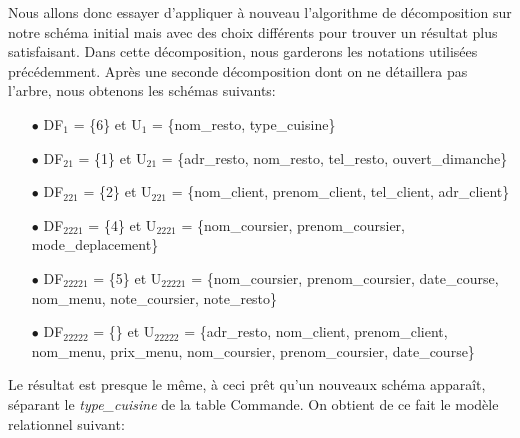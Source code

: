 \documentclass[french]{article}
\begin{document}
            Nous allons donc essayer d'appliquer à nouveau l'algorithme de décomposition sur notre schéma initial mais avec des choix différents pour trouver un résultat plus satisfaisant. Dans cette décomposition, nous garderons les notations utilisées précédemment.\newline
            Après une seconde décomposition dont on ne détaillera pas l'arbre, nous obtenons les schémas suivants:\bigskip
            \begin{enumerate}
                \item[$\bullet$] DF$_{1}$ = \{6\} et U$_{1}$ = \{nom\_resto, type\_cuisine\}
                \item[$\bullet$] DF$_{21}$ = \{1\} et U$_{21}$ = \{adr\_resto, nom\_resto, tel\_resto, ouvert\_dimanche\}
                \item[$\bullet$] DF$_{221}$ = \{2\} et U$_{221}$ = \{nom\_client, prenom\_client, tel\_client, adr\_client\}
                \item[$\bullet$] DF$_{2221}$ = \{4\} et U$_{2221}$ = \{nom\_coursier, prenom\_coursier, mode\_deplacement\}
                \item[$\bullet$] DF$_{22221}$ = \{5\} et U$_{22221}$ = \{nom\_coursier, prenom\_coursier, date\_course, nom\_menu, \newline note\_coursier, note\_resto\} 
                \item[$\bullet$] DF$_{22222}$ = \{\} et U$_{22222}$ = \{adr\_resto, nom\_client, prenom\_client, nom\_menu, prix\_menu, nom\_coursier, prenom\_coursier, date\_course\}\bigskip
            \end{enumerate}
            Le résultat est presque le même, à ceci prêt qu'un nouveaux schéma apparaît, séparant le \newline 
            \emph{type\_cuisine} de la table Commande. On obtient de ce fait le modèle relationnel suivant:\bigskip
\end{document}
